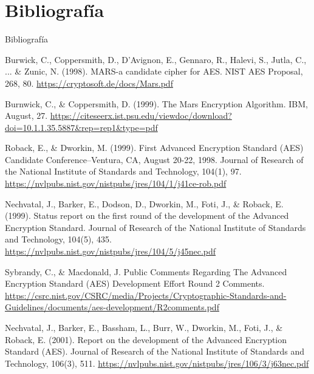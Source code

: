 \documentclass{beamer}
\begin{document}
\section{Bibliografía}
\begin{frame}[allowframebreaks]{Bibliografía}

\scriptsize
\begin{thebibliography}{9}


	Burwick, C., Coppersmith, D., D’Avignon, E., Gennaro, R., Halevi, S., Jutla, C., ... \& Zunic, N. (1998). MARS-a candidate cipher for AES. NIST AES Proposal, 268, 80. \url{https://cryptosoft.de/docs/Mars.pdf}


	Burnwick, C., \& Coppersmith, D. (1999). The Mars Encryption Algorithm. IBM, August, 27. \url{https://citeseerx.ist.psu.edu/viewdoc/download?doi=10.1.1.35.5887&rep=rep1&type=pdf}



	Roback, E., \& Dworkin, M. (1999). First Advanced Encryption Standard (AES) Candidate Conference--Ventura, CA, August 20-22, 1998. Journal of Research of the National Institute of Standards and Technology, 104(1), 97. \url{https://nvlpubs.nist.gov/nistpubs/jres/104/1/j41ce-rob.pdf}


	Nechvatal, J., Barker, E., Dodson, D., Dworkin, M., Foti, J., \& Roback, E. (1999). Status report on the first round of the development of the Advanced Encryption Standard. Journal of Research of the National Institute of Standards and Technology, 104(5), 435. \url{https://nvlpubs.nist.gov/nistpubs/jres/104/5/j45nec.pdf}

	Sybrandy, C., \& Macdonald, J. Public Comments Regarding The Advanced Encryption Standard (AES) Development Effort Round 2 Comments.	\url{https://csrc.nist.gov/CSRC/media/Projects/Cryptographic-Standards-and-Guidelines/documents/aes-development/R2comments.pdf}


	Nechvatal, J., Barker, E., Bassham, L., Burr, W., Dworkin, M., Foti, J., \& Roback, E. (2001). Report on the development of the Advanced Encryption Standard (AES). Journal of Research of the National Institute of Standards and Technology, 106(3), 511. \url{https://nvlpubs.nist.gov/nistpubs/jres/106/3/j63nec.pdf}


\end{thebibliography}
\end{frame}
\end{document}
